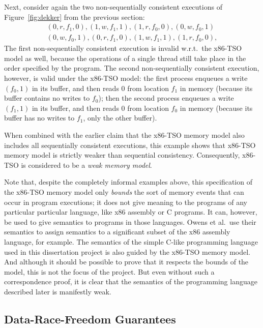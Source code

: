 \documentclass[11pt]{report}
\begin{document}
Next, consider again the two non-sequentially consistent executions of Figure~\ref{fig:dekker} from the previous section: \begin{align*}
  (0,r,f_1,0), (1,w,f_1,1), (1,r,f_0,0), (0,w,f_0,1) \\ 
  (0,w,f_0,1), (0,r,f_1,0), (1,w,f_1,1), (1,r,f_0,0), 
\end{align*} The first non-sequentially consistent execution is invalid w.r.t.\ the x86-TSO model as well, because the operations of a single thread still take place in the order specified by the program. The second non-sequentially consistent execution, however, is valid under the x86-TSO model: the first process enqueues a write $(f_0,1)$ in its buffer, and then reads $0$ from location $f_1$ in memory (because its buffer contains no writes to $f_0$); then the second process enqueues a write $(f_1,1)$ in its buffer, and then reads $0$ from location $f_0$ in memory (because its buffer has no writes to $f_1$, only the other buffer). 

When combined with the earlier claim that the x86-TSO memory model also includes all sequentially consistent executions, this example shows that x86-TSO memory model is strictly weaker than sequential consistency. Consequently, x86-TSO is considered to be a \emph{weak memory model}.

Note that, despite the completely informal examples above, this specification of the x86-TSO memory model only \emph{bounds} the sort of memory events that can occur in program executions; it does not give meaning to the programs of any particular particular language, like x86 assembly or C programs. It can, however, be used to give semantics to programs in those languages. Owens et al.\ use their semantics to assign semantics to a significant subset of the x86 assembly language, for example. The semantics of the simple C-like programming language used in this dissertation project is also guided by the x86-TSO memory model. And although it should be possible to prove that it respects the bounds of the model, this is not the focus of the project. But even without such a correspondence proof, it is clear that the semantics of the programming language described later is manifestly weak. 

\subsection{Data-Race-Freedom Guarantees} 
\label{sec:drf}
\end{document}
